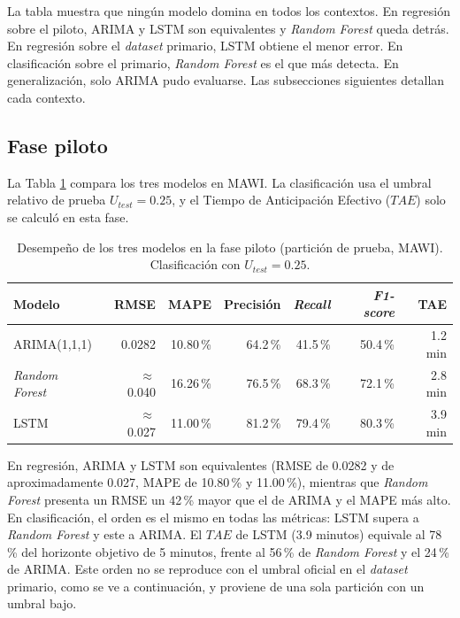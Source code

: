 \documentclass[12pt]{report}
\begin{document}
La tabla muestra que ningún modelo domina en todos los contextos. En regresión sobre el piloto, ARIMA y LSTM son equivalentes y \textit{Random Forest} queda detrás. En regresión sobre el \textit{dataset} primario, LSTM obtiene el menor error. En clasificación sobre el primario, \textit{Random Forest} es el que más detecta. En generalización, solo ARIMA pudo evaluarse. Las subsecciones siguientes detallan cada contexto.

\subsection*{Fase piloto}

La Tabla \ref{tab:sintesis_modelos_piloto} compara los tres modelos en MAWI. La clasificación usa el umbral relativo de prueba $U_{test}=0.25$, y el Tiempo de Anticipación Efectivo ($TAE$) solo se calculó en esta fase.

\begin{table}[H]
    \centering
    \small
    \begin{tabular}{|l|r|r|r|r|r|r|}
        \hline
        \textbf{Modelo} & \textbf{RMSE} & \textbf{MAPE} & \textbf{Precisión} & \textbf{\textit{Recall}} & \textbf{\textit{F1-score}} & \textbf{TAE} \\
        \hline
        ARIMA(1,1,1) & 0.0282 & 10.80\,\% & 64.2\,\% & 41.5\,\% & 50.4\,\% & 1.2 min \\
        \textit{Random Forest} & $\approx$ 0.040 & 16.26\,\% & 76.5\,\% & 68.3\,\% & 72.1\,\% & 2.8 min \\
        LSTM & $\approx$ 0.027 & 11.00\,\% & 81.2\,\% & 79.4\,\% & 80.3\,\% & 3.9 min \\
        \hline
    \end{tabular}
    \caption{Desempeño de los tres modelos en la fase piloto (partición de prueba, MAWI). Clasificación con $U_{test}=0.25$.}
    \label{tab:sintesis_modelos_piloto}
\end{table}

En regresión, ARIMA y LSTM son equivalentes (RMSE de 0.0282 y de aproximadamente 0.027, MAPE de 10.80\,\% y 11.00\,\%), mientras que \textit{Random Forest} presenta un RMSE un 42\,\% mayor que el de ARIMA y el MAPE más alto. En clasificación, el orden es el mismo en todas las métricas: LSTM supera a \textit{Random Forest} y este a ARIMA. El $TAE$ de LSTM (3.9 minutos) equivale al 78\,\% del horizonte objetivo de 5 minutos, frente al 56\,\% de \textit{Random Forest} y el 24\,\% de ARIMA. Este orden no se reproduce con el umbral oficial en el \textit{dataset} primario, como se ve a continuación, y proviene de una sola partición con un umbral bajo.
\end{document}
